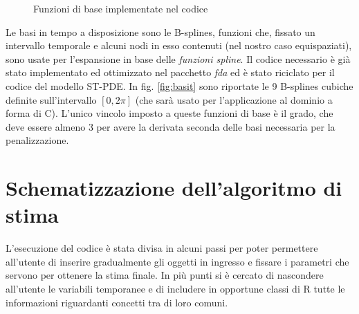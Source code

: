\documentclass[a4paper,11pt,twoside,openright]{book}							%
\begin{document}
\begin{figure}[t]
	\centering
	\caption{Funzioni di base implementate nel codice}
	\label{fig:basi}
\end{figure}

Le basi in tempo a disposizione sono le B-splines, funzioni che, fissato un intervallo temporale e alcuni nodi in esso contenuti (nel nostro caso equispaziati), sono usate per l'espansione in base delle \textit{funzioni spline}. Il codice necessario è già stato implementato ed ottimizzato nel pacchetto \textit{fda} ed è stato riciclato per il codice del modello ST-PDE. In fig. \ref{fig:basit} sono riportate le 9 B-splines cubiche definite sull'intervallo $[0,2\pi]$ (che sarà usato per l'applicazione al dominio a forma di C). L'unico vincolo imposto a queste funzioni di base è il grado, che deve essere almeno 3 per avere la derivata seconda delle basi necessaria per la penalizzazione.

\section{Schematizzazione dell'algoritmo di stima}
L'esecuzione del codice è stata divisa in alcuni passi per poter permettere all'utente di inserire gradualmente gli oggetti in ingresso e fissare i parametri che servono per ottenere la stima finale. In più punti si è cercato di nascondere all'utente le variabili temporanee e di includere in opportune classi di R tutte le informazioni riguardanti concetti tra di loro comuni. 
\end{document}
